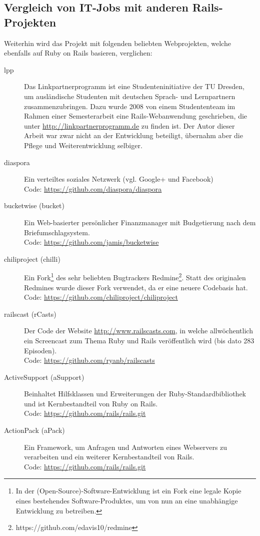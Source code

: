\subsection{Vergleich von IT-Jobs mit anderen Rails-Projekten}
Weiterhin wird das Projekt mit folgenden beliebten Webprojekten, welche ebenfalls auf Ruby on Rails basieren, verglichen:
\begin{description}
\item[lpp] Das Linkpartnerprogramm ist eine Studenteninitiative der TU Dresden, um ausländische Studenten mit deutschen Sprach- und Lernpartnern zusammenzubringen. Dazu wurde 2008 von einem Studententeam im Rahmen einer Semesterarbeit eine Rails-Webanwendung geschrieben, die unter \url{http://linkpartnerprogramm.de} zu finden ist. Der Autor dieser Arbeit war zwar nicht an der Entwicklung beteiligt, übernahm aber die Pflege und Weiterentwicklung selbiger.
 \item[diaspora] Ein verteiltes soziales Netzwerk (vgl. Google+ und Facebook) \\
 Code: \url{https://github.com/diaspora/diaspora}
 \item[bucketwise (bucket)] Ein Web-basierter persönlicher Finanzmanager mit Budgetierung nach dem Briefumschlagsystem.\\
 Code: \url{https://github.com/jamis/bucketwise}
 \item[chiliproject (chilli)] Ein Fork\footnote{In der (Open-Source)-Software-Entwicklung ist ein Fork eine legale Kopie eines bestehendes Software-Produktes, um von nun an eine unabhängige Entwicklung zu betreiben.} des sehr beliebten Bugtrackers Redmine\footnote{https://github.com/edavis10/redmine}. Statt des originalen Redmines wurde dieser Fork verwendet, da er eine neuere Codebasis hat.\\
 Code: \url{https://github.com/chiliproject/chiliproject}
 \item[railscast (rCasts)] Der Code der Website \url{http://www.railscasts.com}, in welche allwöchentlich ein Screencast zum Thema Ruby und Rails veröffentlich wird (bis dato 283 Episoden).\\
 Code: \url{https://github.com/ryanb/railscasts}
 \item[ActiveSupport (aSupport)] Beinhaltet Hilfsklassen und Erweiterungen der Ruby\hyp{}Standardbibliothek und ist Kernbestandteil von Ruby on Rails. \\
 Code: \url{https://github.com/rails/rails.git}
 \item[ActionPack (aPack)] Ein Framework, um Anfragen und Antworten eines Webservers zu verarbeiten und ein weiterer Kernbestandteil von Rails.\\
 Code: \url{https://github.com/rails/rails.git}
\end{description}

